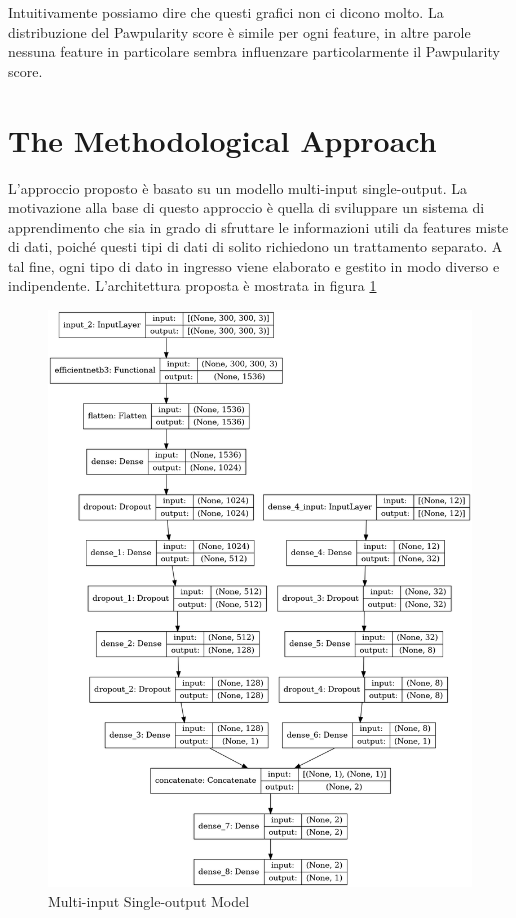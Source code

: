     Intuitivamente possiamo dire che questi grafici non ci dicono molto. La distribuzione del Pawpularity score è simile per ogni feature, in altre parole nessuna feature in particolare sembra influenzare particolarmente il Pawpularity score.
    \vfill

\section{The Methodological Approach}


    L'approccio proposto è basato su un modello multi-input single-output. La motivazione alla base di questo approccio è quella di sviluppare un sistema di apprendimento che sia in grado di sfruttare le informazioni utili da features miste di dati, poiché questi tipi di dati di solito richiedono un trattamento separato. A tal fine, ogni tipo di dato in ingresso viene elaborato e gestito in modo diverso e indipendente. L'architettura proposta è mostrata in figura \ref{fig:model}


    \begin{figure}[h!]
        \centering
        \includegraphics[scale=0.35]{Plot/Model-Plot.png}
        \caption{Multi-input Single-output Model}
        \label{fig:model}
    \end{figure}

